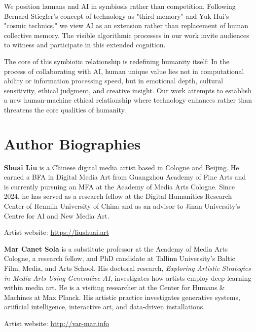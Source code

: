 \documentclass{article}
\begin{document}
We position humans and AI in symbiosis rather than competition. Following Bernard Stiegler's concept of technology as "third memory" and Yuk Hui's "cosmic technics," we view AI as an extension rather than replacement of human collective memory. The visible algorithmic processes in our work invite audiences to witness and participate in this extended cognition.

The core of this symbiotic relationship is redefining humanity itself: In the process of collaborating with AI, human unique value lies not in computational ability or information processing speed, but in emotional depth, cultural sensitivity, ethical judgment, and creative insight. Our work attempts to establish a new human-machine ethical relationship where technology enhances rather than threatens the core qualities of humanity.

\section{Author Biographies}

\textbf{Shuai Liu} is a Chinese digital media artist based in Cologne and Beijing. He earned a BFA in Digital Media Art from Guangzhou Academy of Fine Arts and is currently pursuing an MFA at the Academy of Media Arts Cologne. Since 2024, he has served as a research fellow at the Digital Humanities Research Center of Renmin University of China and as an advisor to Jinan University's Centre for AI and New Media Art.

Artist website: \url{https://liushuai.art}

\textbf{Mar Canet Sola} is a substitute professor at the Academy of Media Arts Cologne, a research fellow, and PhD candidate at Tallinn University’s Baltic Film, Media, and Arts School. His doctoral research, \textit{Exploring Artistic Strategies in Media Arts Using Generative AI}, investigates how artists employ deep learning within media art. He is a visiting researcher at the Center for Humans \& Machines at Max Planck. His artistic practice investigates generative systems, artificial intelligence, interactive art, and data-driven installations.

Artist website: \url{http://var-mar.info}
\end{document}
